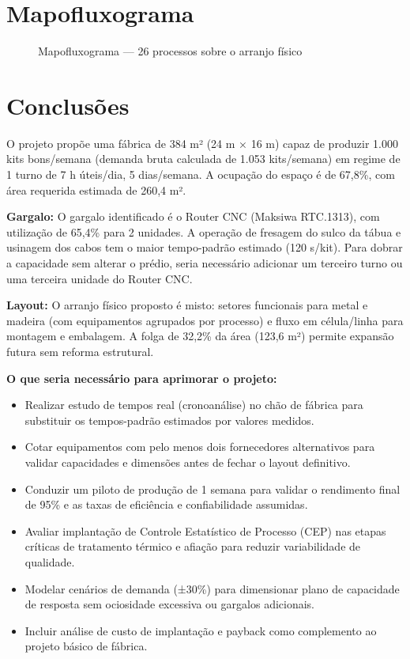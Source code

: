\documentclass[12pt,a4paper,oneside,english,brazil]{abntex2}
\begin{document}
\chapter{Mapofluxograma}
\begin{figure}[H]
  \centering
  
  \caption{Mapofluxograma --- 26 processos sobre o arranjo físico}
\end{figure}

\chapter{Conclusões}
O projeto propõe uma fábrica de 384 m² (24 m × 16 m) capaz de produzir 1.000 kits bons/semana (demanda bruta calculada de 1.053 kits/semana) em regime de 1 turno de 7 h úteis/dia, 5 dias/semana. A ocupação do espaço é de 67,8\%, com área requerida estimada de 260,4 m².

\textbf{Gargalo:} O gargalo identificado é o Router CNC (Maksiwa RTC.1313), com utilização de 65,4\% para 2 unidades. A operação de fresagem do sulco da tábua e usinagem dos cabos tem o maior tempo-padrão estimado (120 s/kit). Para dobrar a capacidade sem alterar o prédio, seria necessário adicionar um terceiro turno ou uma terceira unidade do Router CNC.

\textbf{Layout:} O arranjo físico proposto é misto: setores funcionais para metal e madeira (com equipamentos agrupados por processo) e fluxo em célula/linha para montagem e embalagem. A folga de 32,2\% da área (123,6 m²) permite expansão futura sem reforma estrutural.

\textbf{O que seria necessário para aprimorar o projeto:}
\begin{itemize}
  \item Realizar estudo de tempos real (cronoanálise) no chão de fábrica para substituir os tempos-padrão estimados por valores medidos.
  \item Cotar equipamentos com pelo menos dois fornecedores alternativos para validar capacidades e dimensões antes de fechar o layout definitivo.
  \item Conduzir um piloto de produção de 1 semana para validar o rendimento final de 95\% e as taxas de eficiência e confiabilidade assumidas.
  \item Avaliar implantação de Controle Estatístico de Processo (CEP) nas etapas críticas de tratamento térmico e afiação para reduzir variabilidade de qualidade.
  \item Modelar cenários de demanda (±30\%) para dimensionar plano de capacidade de resposta sem ociosidade excessiva ou gargalos adicionais.
  \item Incluir análise de custo de implantação e payback como complemento ao projeto básico de fábrica.
\end{itemize}


\end{document}
